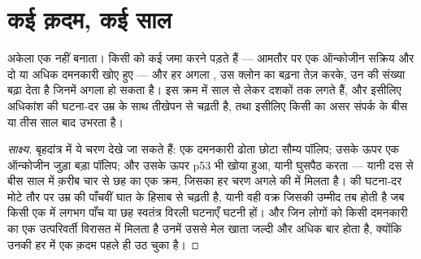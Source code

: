 \section{कई क़दम, कई साल}

\begin{proposition}[कैंसर कई क़दमों की प्रक्रिया है]\label{prop:g11:cancer:multistep}
अकेला एक   नहीं बनाता। किसी  को कई जमा करने पड़ते
हैं --- आमतौर पर एक ऑन्कोजीन सक्रिय और दो या अधिक दमनकारी खोए हुए --- और
हर अगला , उस क्लोन का बढ़ना तेज़ करके, उन  की संख्या
बढ़ा देता है जिनमें अगला हो सकता है। इस क्रम में साल से लेकर दशकों तक लगते
हैं, और इसीलिए अधिकांश  की घटना-दर उम्र के साथ तीखेपन से चढ़ती है,
तथा इसीलिए किसी  का असर संपर्क के बीस या तीस साल बाद उभरता है।
\end{proposition}
\begin{proof}[साक्ष्य]
बृहदांत्र में ये चरण देखे जा सकते हैं: एक दमनकारी  ढोता छोटा
सौम्य पॉलिप; उसके ऊपर एक ऑन्कोजीन जुड़ा बड़ा पॉलिप; और उसके ऊपर p53 भी खोया
हुआ, यानी घुसपैठ करता  --- यानी दस से बीस साल में क़रीब चार से छह
 का एक क्रम, जिसका हर चरण अगले की  में मिलता है।
 की घटना-दर मोटे तौर पर उम्र की पाँचवीं घात के हिसाब से चढ़ती है,
यानी वही वक्र जिसकी उम्मीद तब होती है जब किसी एक  में लगभग पाँच या
छह स्वतंत्र विरली घटनाएँ घटनी हों। और जिन लोगों को किसी दमनकारी  का एक
उत्परिवर्ती  विरासत में मिलता है उनमें उससे मेल खाता  जल्दी और
अधिक बार होता है, क्योंकि उनकी हर  में एक क़दम पहले ही उठ चुका है।
\end{proof}

